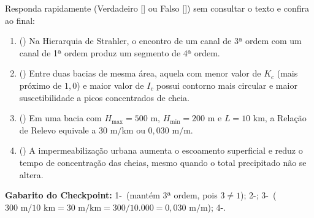 \begin{boxTeste}
Responda rapidamente (Verdadeiro [\V] ou Falso [\F]) sem consultar o texto e confira ao final:
\begin{enumerate}[leftmargin=1.6em, itemsep=2.5pt]
  \item (\quad) Na Hierarquia de Strahler, o encontro de um canal de 3ª ordem com um canal de 1ª ordem produz um segmento de 4ª ordem.
  \item (\quad) Entre duas bacias de mesma área, aquela com menor valor de $K_c$ (mais próximo de $1{,}0$) e maior valor de $I_c$ possui contorno mais circular e maior suscetibilidade a picos concentrados de cheia.
  \item (\quad) Em uma bacia com $H_{\max} = 500\text{ m}$, $H_{\min} = 200\text{ m}$ e $L = 10\text{ km}$, a Relação de Relevo equivale a $30\text{ m}/\text{km}$ ou $0{,}030\text{ m}/\text{m}$.
  \item (\quad) A impermeabilização urbana aumenta o escoamento superficial e reduz o tempo de concentração das cheias, mesmo quando o total precipitado não se altera.
\end{enumerate}
\vspace{4pt}
{\footnotesize\textbf{Gabarito do Checkpoint:} 1-\F\ (mantém 3ª ordem, pois $3 \neq 1$); 2-\V; 3-\V\ ($300\text{ m}/10\text{ km} = 30\text{ m}/\text{km} = 300/10.000 = 0{,}030\text{ m}/\text{m}$); 4-\V.}
\end{boxTeste}
